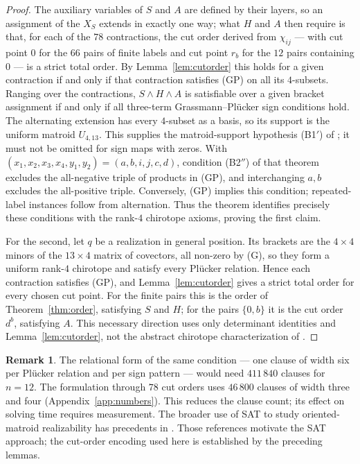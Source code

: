 \documentclass[11pt,reqno]{amsart}
\theoremstyle{plain}
\theoremstyle{definition}
\newtheorem{remark}[theorem]{Remark}
\begin{document}
\begin{proof}
The auxiliary variables of $S$ and $A$ are defined by their layers, so an assignment of the $X_S$
extends in exactly one way; what $H$ and $A$ then require is that, for each of the $78$ contractions,
the cut order derived from $\chi_{ij}$ --- with cut point $0$ for the $66$ pairs of finite labels and
cut point $r_b$ for the $12$ pairs containing $0$ --- is a strict total order. By
Lemma~\ref{lem:cutorder} this holds for a given contraction if and only if that contraction satisfies
(GP) on all its $4$-subsets. Ranging over the contractions, $S\wedge H\wedge A$ is satisfiable over a
given bracket assignment if and only if all three-term Grassmann--Plücker sign conditions hold.
The alternating extension has every $4$-subset as a basis, so its support is the uniform matroid
$U_{4,13}$. This supplies the matroid-support hypothesis (B1$'$) of
\cite[Theorem 3.6.2, p.~138]{BLSWZ1999}; it must not be omitted for sign maps with zeros.
With $(x_1,x_2,x_3,x_4,y_1,y_2)=(a,b,i,j,c,d)$, condition (B2$''$) of that theorem excludes
the all-negative triple of products in (GP), and interchanging $a,b$ excludes the all-positive
triple. Conversely, (GP) implies this condition; repeated-label instances follow from alternation.
Thus the theorem identifies precisely these conditions with the rank-$4$ chirotope axioms,
proving the first claim.

For the second, let $q$ be a realization in general position. Its brackets are the $4\times4$ minors
of the $13\times4$ matrix of covectors, all non-zero by (G), so they form a uniform rank-$4$ chirotope
and satisfy every Plücker relation. Hence each contraction satisfies (GP), and
Lemma~\ref{lem:cutorder} gives a strict total order for every chosen cut point.
For the finite pairs this is the order of Theorem~\ref{thm:order}, satisfying $S$ and $H$;
for the pairs $\{0,b\}$ it is the cut order $d^b$, satisfying $A$.
This necessary direction uses only determinant identities and Lemma~\ref{lem:cutorder},
not the abstract chirotope characterization of \cite{BLSWZ1999}.
\end{proof}

\begin{remark}
The relational form of the same condition --- one clause of width six per Plücker relation and per
sign pattern --- would need $411\,840$ clauses for $n=12$. The formulation through $78$ cut orders
uses $46\,800$ clauses of width three and four (Appendix~\ref{app:numbers}).
This reduces the clause count; its effect on solving time requires measurement.
The broader use of SAT to study oriented-matroid realizability has precedents in
\cite{Schewe2010,Scheucher2023}. Those references motivate the SAT approach; the
cut-order encoding used here is established by the preceding lemmas.
\end{remark}
\end{document}
